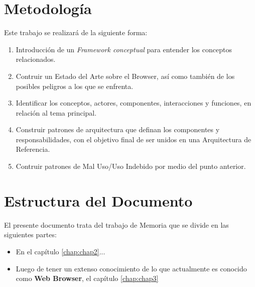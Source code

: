 \section{Metodología}
\label{chap1:Met}
Este trabajo se realizará de la siguiente forma:
\begin{enumerate}
	\item Introducción de un \textit{Framework conceptual} para entender los conceptos relacionados.
	\item Contruir un Estado del Arte sobre el Browser, así como también de los posibles peligros a los que se enfrenta.
	\item Identificar los conceptos, actores, componentes, interacciones y funciones, en relación al tema principal.
	\item Construir patrones de arquitectura que definan los componentes y responsabilidades, con el objetivo final de ser unidos en una Arquitectura de Referencia.
	\item Contruir patrones de Mal Uso/Uso Indebido por medio del punto anterior.
\end{enumerate}

\section{Estructura del Documento}
\label{chap1:estruct}

El presente documento trata del trabajo de Memoria que se divide en las siguientes partes:

\begin{itemize}
	\item En el capítulo \ref{chap:chap2}... %
	\item Luego de tener un extenso conocimiento de lo que actualmente es conocido como \textbf{Web Browser}, el capítulo \ref{chap:chap3}
\end{itemize}












